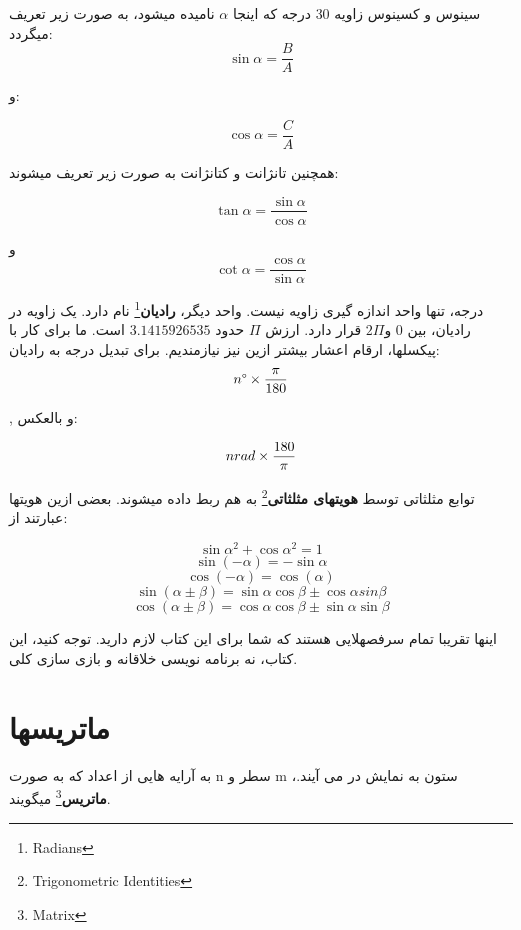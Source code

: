 \documentclass[14pt,a4paper]{memoir}
\begin{document}
	 سینوس و کسینوس زاویه 30 درجه که اینجا $ \alpha $ نامیده میشود، به صورت زیر تعریف میگردد:
	 \[ \sin \alpha = \frac{B}{A} \]
	 
	 و:
	 
	 \[ \cos \alpha = \frac{C}{A} \]
	 
	 همچنین تانژانت و کتانژانت به صورت زیر تعریف میشوند:
	 
	  \[ \tan \alpha = \frac{\sin \alpha}{\cos \alpha} \]
	  
	  
	  و 
	  \[ \cot \alpha = \frac{\cos \alpha}{\sin \alpha} \]
	  
	  
	  درجه، تنها واحد اندازه گیری زاویه نیست. واحد دیگر، \textbf{رادیان}\footnote{Radians} نام دارد. یک زاویه در رادیان، بین $ 0 $ و$   2\Pi $ قرار دارد. ارزش $ \Pi $ حدود $ 3.1415926535 $ است. ما برای کار با پیکسلها، ارقام اعشار بیشتر ازین نیز نیازمندیم. برای تبدیل درجه به رادیان:
	  \[ n\degree \times 	  \frac{\pi}{180} \]
	  
	  , و بالعکس:
	  
	  \[ n \space rad \times 	  \frac{180}{\pi} \]
	  
	  
	  
	  
	  توابع مثلثاتی توسط \textbf{هویتهای مثلثاتی}\footnote{Trigonometric Identities} به هم ربط داده میشوند. بعضی ازین هویتها عبارتند از:
	  
	  \[ {\sin \alpha}^2 + {\cos \alpha}^2 = 1 \]
	  \[ \sin(-\alpha) = -\sin\alpha \]
	  \[ \cos(-\alpha) = \cos(\alpha) \]
	  \[ \sin(\alpha\pm\beta) = \sin\alpha\cos\beta \pm\cos\alpha sin\beta \]
	  \[ \cos(\alpha\pm\beta) = \cos\alpha\cos\beta\pm\sin\alpha\sin\beta \]
	 
	 
	 اینها تقریبا تمام سرفصهلایی هستند که شما برای این کتاب لازم دارید. توجه کنید، این کتاب، نه برنامه نویسی خلاقانه و بازی سازی کلی.
	 
	 \section{ماتریسها}\label{matrix}
	 
	 به آرایه هایی از اعداد که به صورت n سطر و m ستون به نمایش در می آیند.، \textbf{ماتریس}\footnote{Matrix} میگویند. 
	 
	 
\end{document}
